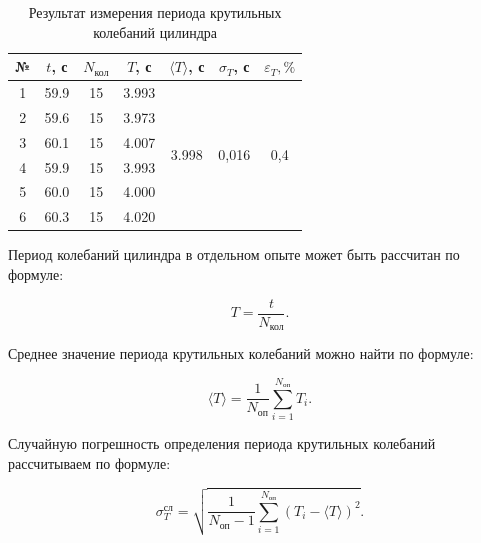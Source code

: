 \documentclass[12pt, a4paper]{article}
\begin{document}
\begin{table}[h!]
	\centering
	\begin{tabular}{|c|c|c|c|c|c|c|}
		\hline
		№ & $ t $, с & $ N_\text{кол} $ & $ T $, с & $ \langle T \rangle $, с                & $ \sigma_T $, с             & $ \varepsilon_T, \% $                      \\ \hline
		1 & 59.9 & 15              & 3.993     & \multirow{6}{*}{3.998} & \multirow{6}{*}{0,016} & \multirow{6}{*}{0,4}      \\ \cline{1-4}
		2 & 59.6 & 15              & 3.973     &                        &                        &                            \\ \cline{1-4}
		3 & 60.1 & 15              & 4.007     &                        &                        &                            \\ \cline{1-4}
        4 & 59.9 & 15              & 3.993     &                        &                        &                            \\ \cline{1-4}
        5 & 60.0 & 15              & 4.000     &                        &                        &                            \\ \cline{1-4}
        6 & 60.3 & 15              & 4.020     &                        &                        &                            \\ \hline
	\end{tabular}
	\caption{Результат измерения периода крутильных колебаний цилиндра}
\end{table}

Период колебаний цилиндра в отдельном опыте может быть рассчитан по формуле:

\begin{equation}
T = \frac{t}{N_\text{кол}}.
\end{equation}

Среднее значение периода крутильных колебаний можно найти по формуле:

\begin{equation}
\langle T \rangle = \frac{1}{N_\text{оп}}\sum_{i = 1}^{N_\text{оп}} T_i.
\end{equation}

Случайную погрешность определения периода крутильных колебаний рассчитываем по формуле:

\begin{equation}
\sigma^{\text{сл}}_T = \sqrt{\frac{1}{N_\text{оп} - 1} \sum_{i = 1}^{N_\text{оп}} \left(T_i - \langle T \rangle \right)^2}.
\end{equation}
\end{document}
